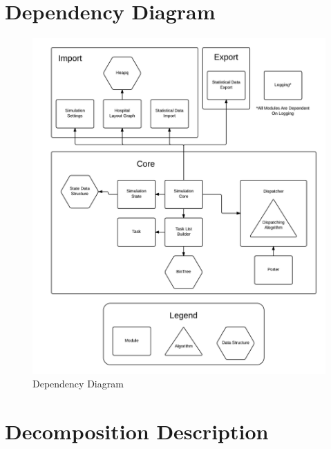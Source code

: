 \documentclass[paper=letter, fontsize=10pt]{scrartcl}
\numberwithin{equation}{section}		%
\numberwithin{figure}{section}			%
\numberwithin{table}{section}				%
\begin{document}
\section{Dependency Diagram}
\begin{figure}[H]
	\begin{center}
		\includegraphics[width=1\columnwidth]{../Process_Diagrams/Dependency_Diagram.png}
		\caption{Dependency Diagram}
	\end{center}
\end{figure}
\newpage

\section{Decomposition Description}
\end{document}
